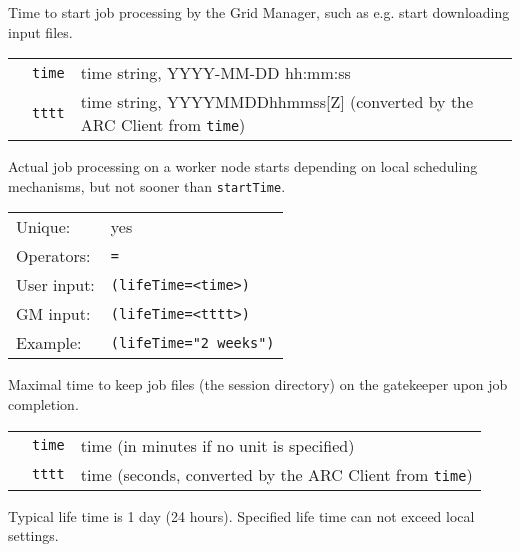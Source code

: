   Time to start job processing by the Grid Manager, such as e.g. start downloading input files.

  \begin{tabular}{llp{10cm}}
    \hspace*{1cm}&\texttt{time} & time string, YYYY-MM-DD hh:mm:ss\\ 
    \hspace*{1cm}&\texttt{tttt} & time string, YYYYMMDDhhmmss[Z] (converted by the ARC Client from
    \texttt{time})\\
  \end{tabular}
  
  \begin{framed}
   Actual job processing on a worker node starts depending on local scheduling mechanisms, but not sooner than \texttt{startTime}. 
   \end{framed}

  \hspace*{0.5cm}
  \begin{shaded}
  \end{shaded}
  \begin{tabular}{lp{13cm}}
    Unique:&yes\\
    Operators:&\verb#=#\\
    User input:&\verb#(lifeTime=<time>)#\\
    GM input:&\verb#(lifeTime=<tttt>)#\\
    Example:&\verb#(lifeTime="2 weeks")#\\
  \end{tabular}

  Maximal time to keep job files (the session directory) on the
  gatekeeper upon job completion.

  \begin{tabular}{llp{10cm}}
    \hspace*{1cm}&\texttt{time} & time (in minutes if no unit is specified)\\
    \hspace*{1cm}&\texttt{tttt} & time (seconds, converted by the ARC Client from \texttt{time})\\
  \end{tabular}

  Typical life time is 1 day (24 hours). Specified life time can not
  exceed local settings.

